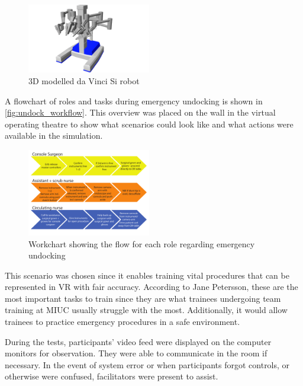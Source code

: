 \documentclass[conference]{IEEEtran}
\begin{document}
\begin{figure}
\centering
\includegraphics[width=0.48\textwidth]{Figures/TempRender.png}
\caption{3D modelled da Vinci Si robot}
\label{fig:dav}
\end{figure}

A flowchart of roles and tasks during emergency undocking is shown in \autoref{fig:undock_workflow}. This overview was placed on the wall in the virtual operating theatre to show what scenarios could look like and what actions were available in the simulation. 

\begin{figure}[h]
	\centering
	\includegraphics[width=0.48\textwidth]{figures/workflow_chart}
	\caption{Workchart showing the flow for each role regarding emergency undocking}
	\label{fig:undock_workflow}
\end{figure}

This scenario was chosen since it enables training vital procedures that can be represented in VR with fair accuracy. According to Jane Petersson, these are the most important tasks to train since they are what trainees undergoing team training at MIUC usually struggle with the most. Additionally, it would allow trainees to practice emergency procedures in a safe environment.


During the tests, participants' video feed were displayed on the computer monitors for observation. They were able to communicate in the room if necessary. In the event of system error or when participants forgot controls, or otherwise were confused, facilitators were present to assist. 
\end{document}
